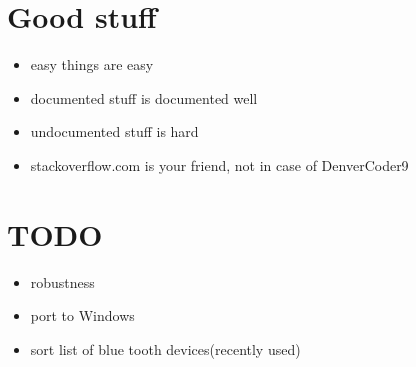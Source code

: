 \documentclass[ddc nogerman]{tudbeamer}
\begin{document}
\section{Good stuff}
\begin{frame}
    \begin{itemize}
        \item easy things are easy
    	\item documented stuff is documented well
    	\item undocumented stuff is hard
        \item stackoverflow.com is your friend, not in case of DenverCoder9
    \end{itemize}
\end{frame}

\section{TODO}
\begin{frame}
    \begin{itemize}
        \item robustness
        \item port to Windows
        \item sort list of blue tooth devices(recently used)
    \end{itemize}
\end{frame}
\end{document}
